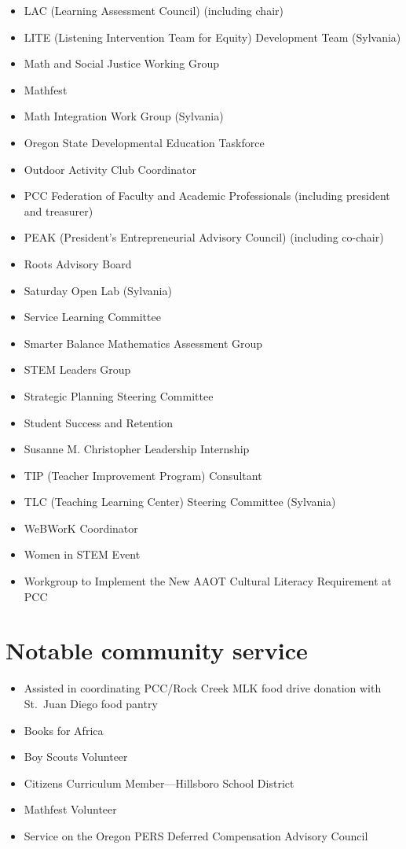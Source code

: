 \begin{widepage}
\begin{multicols*}{2}
\begin{itemize}[label={}]
\item LAC (Learning Assessment Council) (including chair)
\item LITE (Listening Intervention Team for Equity) Development Team (Sylvania)
\item Math and Social Justice Working Group
\item Mathfest
\item Math Integration Work Group (Sylvania)
\item Oregon State Developmental Education Taskforce
\item Outdoor Activity Club Coordinator
\item PCC Federation of Faculty and Academic Professionals (including president and treasurer)
\item PEAK (President's Entrepreneurial Advisory Council) (including co-chair)
\item Roots Advisory Board
\item Saturday Open Lab (Sylvania)
\item Service Learning Committee
\item Smarter Balance Mathematics Assessment Group
\item STEM Leaders Group
\item Strategic Planning Steering Committee
\item Student Success and Retention
\item Susanne M. Christopher Leadership Internship
\item TIP (Teacher Improvement Program) Consultant
\item TLC (Teaching Learning Center) Steering Committee (Sylvania)
\item WeBWorK Coordinator
\item Women in STEM Event
\item Workgroup to Implement the New AAOT Cultural Literacy Requirement at PCC
\end{itemize}

\section*{Notable community service}

\begin{itemize}
\item Assisted in coordinating PCC/Rock Creek MLK food drive donation with St.\ Juan Diego food pantry
\item Books for Africa
\item Boy Scouts Volunteer
\item Citizens Curriculum Member---Hillsboro School District
\item Mathfest Volunteer
\item Service on the Oregon PERS Deferred Compensation Advisory Council
\end{itemize}


\end{multicols*}
\end{widepage}
